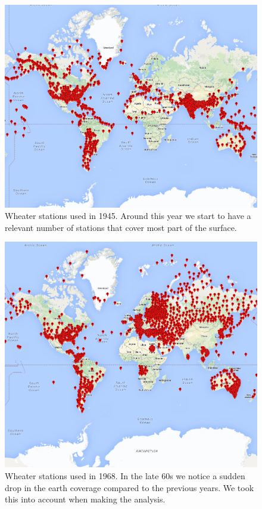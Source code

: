 \documentclass{vldb}
\begin{document}
\begin{figure}[tbh]
\includegraphics[width=1\linewidth]{stations1945}
\caption{Wheater stations used in 1945. Around this year we start to have a relevant number of stations that cover most part of the surface.}
\label{fig:stations1945}
\end{figure}
\begin{figure}[tbh]
\includegraphics[width=1\linewidth]{stations1968}
\caption{Wheater stations used in 1968. In the late 60s we notice a sudden drop in the earth coverage compared to the previous years. We took this into account when making the analysis.}
\label{fig:stations1968}
\end{figure}
\end{document}
